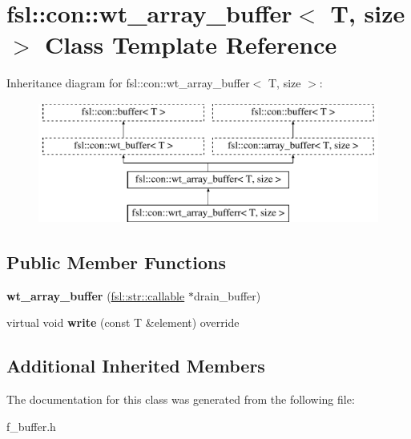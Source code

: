 \hypertarget{classfsl_1_1con_1_1wt__array__buffer}{}\section{fsl\+::con\+::wt\+\_\+array\+\_\+buffer$<$ T, size $>$ Class Template Reference}
\label{classfsl_1_1con_1_1wt__array__buffer}
Inheritance diagram for fsl\+::con\+::wt\+\_\+array\+\_\+buffer$<$ T, size $>$\+:\begin{figure}[H]
\begin{center}
\leavevmode
\includegraphics[height=4.000000cm]{classfsl_1_1con_1_1wt__array__buffer}
\end{center}
\end{figure}
\subsection*{Public Member Functions}
\begin{DoxyCompactItemize}
\item 
\mbox{\label{classfsl_1_1con_1_1wt__array__buffer_ad2a875b44f081c7bc995ff6dbd15d9e4}} 
{\bfseries wt\+\_\+array\+\_\+buffer} (\mbox{\hyperlink{classfsl_1_1str_1_1callable}{fsl\+::str\+::callable}} $\ast$drain\+\_\+buffer)
\item 
\mbox{\label{classfsl_1_1con_1_1wt__array__buffer_a6d52c874e90b1856cabe8a5af441f6d6}} 
virtual void {\bfseries write} (const T \&element) override
\end{DoxyCompactItemize}
\subsection*{Additional Inherited Members}


The documentation for this class was generated from the following file\+:\begin{DoxyCompactItemize}
\item 
f\+\_\+buffer.\+h\end{DoxyCompactItemize}
